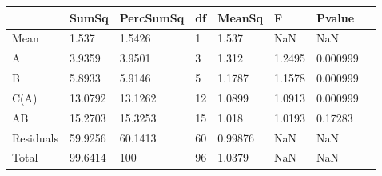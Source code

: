 \begin{table} 
\begin{tabular}{llllllll}
 & SumSq & PercSumSq & df & MeanSq & F & Pvalue \\ 
 \hline 
Mean & 1.537 & 1.5426 & 1 & 1.537 & NaN & NaN \\ 
A & 3.9359 & 3.9501 & 3 & 1.312 & 1.2495 & 0.000999 \\ 
B & 5.8933 & 5.9146 & 5 & 1.1787 & 1.1578 & 0.000999 \\ 
C(A) & 13.0792 & 13.1262 & 12 & 1.0899 & 1.0913 & 0.000999 \\ 
AB & 15.2703 & 15.3253 & 15 & 1.018 & 1.0193 & 0.17283 \\ 
Residuals & 59.9256 & 60.1413 & 60 & 0.99876 & NaN & NaN \\ 
Total & 99.6414 & 100 & 96 & 1.0379 & NaN & NaN \\ 
\end{tabular} 
\end{table} 
